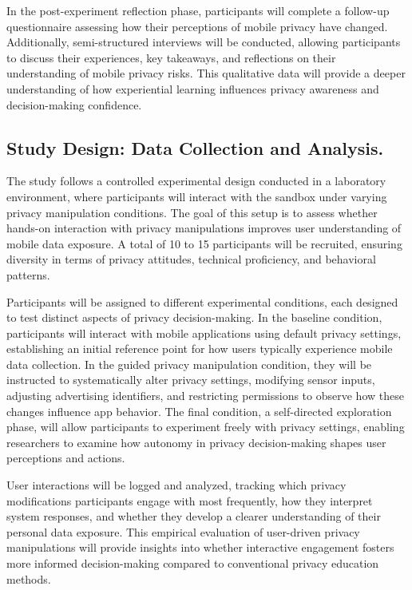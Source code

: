 \documentclass[acmlarge, nonacm]{acmart}
\begin{document}
In the post-experiment reflection phase, participants will complete a follow-up questionnaire assessing how their perceptions of mobile privacy have changed. Additionally, semi-structured interviews will be conducted, allowing participants to discuss their experiences, key takeaways, and reflections on their understanding of mobile privacy risks. This qualitative data will provide a deeper understanding of how experiential learning influences privacy awareness and decision-making confidence.



\subsection{Study Design: Data Collection and Analysis.}

The study follows a controlled experimental design conducted in a laboratory environment, where participants will interact with the sandbox under varying privacy manipulation conditions. The goal of this setup is to assess whether hands-on interaction with privacy manipulations improves user understanding of mobile data exposure. A total of 10 to 15 participants will be recruited, ensuring diversity in terms of privacy attitudes, technical proficiency, and behavioral patterns.

Participants will be assigned to different experimental conditions, each designed to test distinct aspects of privacy decision-making. In the baseline condition, participants will interact with mobile applications using default privacy settings, establishing an initial reference point for how users typically experience mobile data collection. In the guided privacy manipulation condition, they will be instructed to systematically alter privacy settings, modifying sensor inputs, adjusting advertising identifiers, and restricting permissions to observe how these changes influence app behavior. The final condition, a self-directed exploration phase, will allow participants to experiment freely with privacy settings, enabling researchers to examine how autonomy in privacy decision-making shapes user perceptions and actions.

User interactions will be logged and analyzed, tracking which privacy modifications participants engage with most frequently, how they interpret system responses, and whether they develop a clearer understanding of their personal data exposure. This empirical evaluation of user-driven privacy manipulations will provide insights into whether interactive engagement fosters more informed decision-making compared to conventional privacy education methods.
\end{document}

